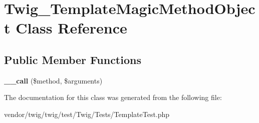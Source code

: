 \hypertarget{classTwig__TemplateMagicMethodObject}{}\section{Twig\+\_\+\+Template\+Magic\+Method\+Object Class Reference}
\label{classTwig__TemplateMagicMethodObject}
\subsection*{Public Member Functions}
\begin{DoxyCompactItemize}
\item 
{\bfseries \+\_\+\+\_\+call} (\$method, \$arguments)\hypertarget{classTwig__TemplateMagicMethodObject_a2757c059f10dc5c3b558531742ef297a}{}\label{classTwig__TemplateMagicMethodObject_a2757c059f10dc5c3b558531742ef297a}

\end{DoxyCompactItemize}


The documentation for this class was generated from the following file\+:\begin{DoxyCompactItemize}
\item 
vendor/twig/twig/test/\+Twig/\+Tests/Template\+Test.\+php\end{DoxyCompactItemize}
